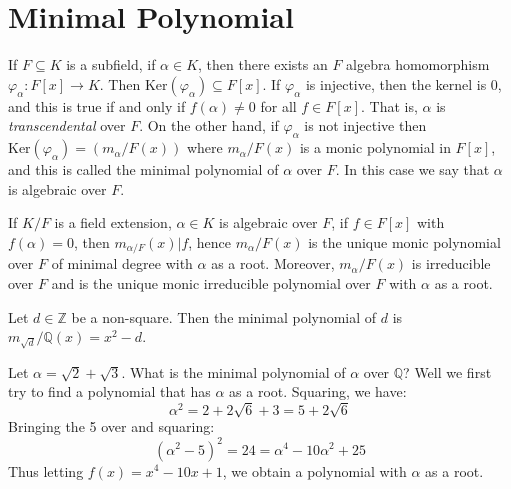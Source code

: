 \documentclass{article}                                                        %
\begin{document}
    \section{Minimal Polynomial}
        If $F\subseteq{K}$ is a subfield, if $\alpha\in{K}$, then there exists
        an $F$ algebra homomorphism $\varphi_{\alpha}:F[x]\rightarrow{K}$.
        Then $\textrm{Ker}(\varphi_{\alpha})\subseteq{F}[x]$. If
        $\varphi_{\alpha}$ is injective, then the kernel is 0, and this is
        true if and only if $f(\alpha)\ne{0}$ for all $f\in{F}[x]$. That is,
        $\alpha$ is \textit{transcendental} over $F$. On the other hand, if
        $\varphi_{\alpha}$ is not injective then
        $\textrm{Ker}(\varphi_{\alpha})=(m_{\alpha}/F(x))$ where
        $m_{\alpha}/F(x)$ is a monic polynomial in $F[x]$, and this is called
        the minimal polynomial of $\alpha$ over $F$. In this case we say that
        $\alpha$ is algebraic over $F$.
        \begin{theorem}
            If $K/F$ is a field extension, $\alpha\in{K}$ is algebraic over $F$,
            if $f\in{F}[x]$ with $f(\alpha)=0$, then
            $m_{\alpha/F}(x)|f$, hence $m_{\alpha}/F(x)$ is the unique monic
            polynomial over $F$ of minimal degree with $\alpha$ as a root.
            Moreover, $m_{\alpha}/F(x)$ is irreducible over $F$ and is the
            unique monic irreducible polynomial over $F$ with $\alpha$ as a
            root.
        \end{theorem}
        \begin{example}
            Let $d\in\mathbb{Z}$ be a non-square. Then the minimal polynomial of
            $d$ is $m_{\sqrt{d}}/\mathbb{Q}(x)=x^{2}-d$.
        \end{example}
        \begin{example}
            Let $\alpha=\sqrt{2}+\sqrt{3}$. What is the minimal polynomial of
            $\alpha$ over $\mathbb{Q}$? Well we first try to find a polynomial
            that has $\alpha$ as a root. Squaring, we have:
            \begin{equation}
                \alpha^{2}=2+2\sqrt{6}+3=5+2\sqrt{6}
            \end{equation}
            Bringing the 5 over and squaring:
            \begin{equation}
                (\alpha^{2}-5)^{2}=24=\alpha^{4}-10\alpha^{2}+25
            \end{equation}
            Thus letting $f(x)=x^{4}-10x+1$, we obtain a polynomial with
            $\alpha$ as a root.
        \end{example}
\end{document}
